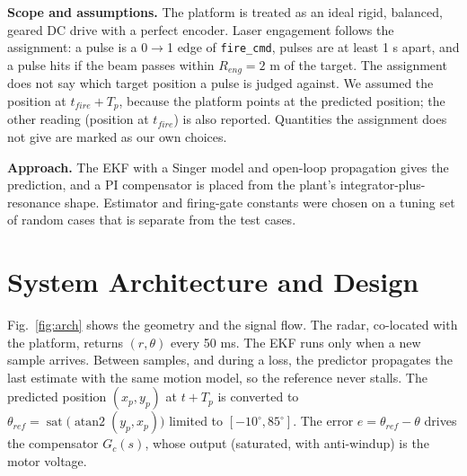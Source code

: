 \documentclass[conference]{IEEEtran}
\newcommand{\dg}{^\circ}
\begin{document}
\textbf{Scope and assumptions.} The platform is treated as an ideal rigid, balanced, geared DC drive with a perfect encoder. Laser engagement follows the assignment: a pulse is a 0$\to$1 edge of \texttt{fire\_cmd}, pulses are at least 1 s apart, and a pulse hits if the beam passes within $R_{eng}=2$ m of the target. The assignment does not say which target position a pulse is judged against. We assumed the position at $t_{fire}+T_p$, because the platform points at the predicted position; the other reading (position at $t_{fire}$) is also reported. Quantities the assignment does not give are marked as our own choices.

\textbf{Approach.} The EKF with a Singer model and open-loop propagation gives the prediction, and a PI compensator is placed from the plant's integrator-plus-resonance shape. Estimator and firing-gate constants were chosen on a tuning set of random cases that is separate from the test cases.

\section{System Architecture and Design}
Fig.~\ref{fig:arch} shows the geometry and the signal flow. The radar, co-located with the platform, returns $(r,\theta)$ every 50 ms. The EKF runs only when a new sample arrives. Between samples, and during a loss, the predictor propagates the last estimate with the same motion model, so the reference never stalls. The predicted position $(x_p,y_p)$ at $t+T_p$ is converted to $\theta_{ref}=\operatorname{sat}\big(\operatorname{atan2}(y_p,x_p)\big)$ limited to $[-10\dg,85\dg]$. The error $e=\theta_{ref}-\theta$ drives the compensator $G_c(s)$, whose output (saturated, with anti-windup) is the motor voltage.
\end{document}
